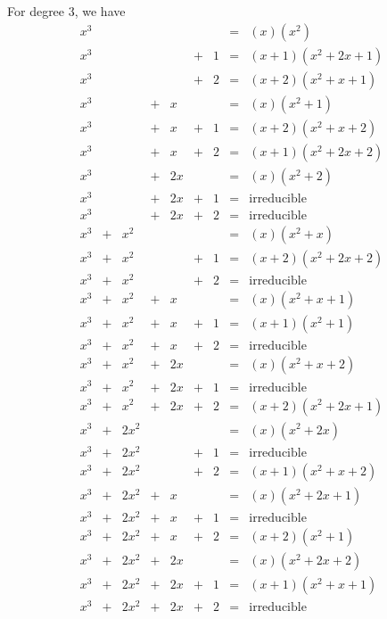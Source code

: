 For degree 3, we have
$$
\begin{array}{ccccccccl}
x^3 &   &      &   &    &   &   & = & (x)(x^2) \\
x^3 &   &      &   &    & + & 1 & = & (x+1)(x^2+2x+1) \\
x^3 &   &      &   &    & + & 2 & = & (x+2)(x^2+x+1) \\
x^3 &   &      & + &  x &   &   & = & (x)(x^2+1) \\
x^3 &   &      & + &  x & + & 1 & = & (x+2)(x^2+x+2) \\
x^3 &   &      & + &  x & + & 2 & = & (x+1)(x^2+2x+2) \\
x^3 &   &      & + & 2x &   &   & = & (x)(x^2+2) \\
x^3 &   &      & + & 2x & + & 1 & = & \mbox{irreducible} \\
x^3 &   &      & + & 2x & + & 2 & = & \mbox{irreducible} \\
x^3 & + &  x^2 &   &    &   &   & = & (x)(x^2+x) \\
x^3 & + &  x^2 &   &    & + & 1 & = & (x+2)(x^2+2x+2) \\
x^3 & + &  x^2 &   &    & + & 2 & = & \mbox{irreducible} \\
x^3 & + &  x^2 & + &  x &   &   & = & (x)(x^2+x+1) \\
x^3 & + &  x^2 & + &  x & + & 1 & = & (x+1)(x^2+1) \\
x^3 & + &  x^2 & + &  x & + & 2 & = & \mbox{irreducible} \\
x^3 & + &  x^2 & + & 2x &   &   & = & (x)(x^2+x+2) \\
x^3 & + &  x^2 & + & 2x & + & 1 & = & \mbox{irreducible} \\
x^3 & + &  x^2 & + & 2x & + & 2 & = & (x+2)(x^2+2x+1) \\
x^3 & + & 2x^2 &   &    &   &   & = & (x)(x^2+2x) \\
x^3 & + & 2x^2 &   &    & + & 1 & = & \mbox{irreducible} \\
x^3 & + & 2x^2 &   &    & + & 2 & = & (x+1)(x^2+x+2) \\
x^3 & + & 2x^2 & + &  x &   &   & = & (x)(x^2+2x+1) \\
x^3 & + & 2x^2 & + &  x & + & 1 & = & \mbox{irreducible} \\
x^3 & + & 2x^2 & + &  x & + & 2 & = & (x+2)(x^2+1) \\
x^3 & + & 2x^2 & + & 2x &   &   & = & (x)(x^2+2x+2) \\
x^3 & + & 2x^2 & + & 2x & + & 1 & = & (x+1)(x^2+x+1) \\
x^3 & + & 2x^2 & + & 2x & + & 2 & = & \mbox{irreducible} \\
\end{array}
$$
